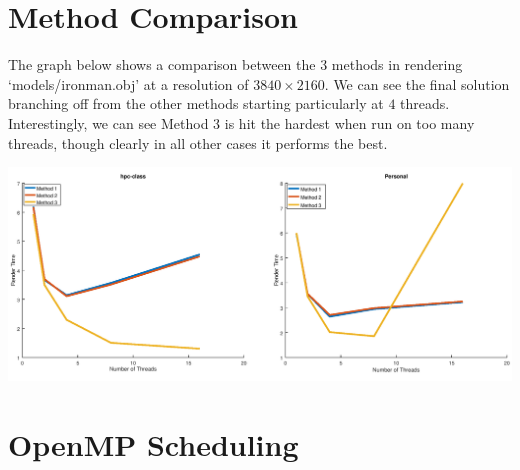 \documentclass[12pt]{article}
\begin{document}
\section*{Method Comparison}

The graph below shows a comparison between the 3 methods in rendering `models/ironman.obj' 
at a resolution of $3840\times2160$. We can see
the final solution branching off from the other methods starting particularly at $4$ threads.
Interestingly, we can see Method 3 is hit the hardest when run on too many threads, though clearly
in all other cases it performs the best.

\begin{center}
	\includegraphics[width=\textwidth]{method_comp.png}
\end{center}

\section*{OpenMP Scheduling}
\end{document}
